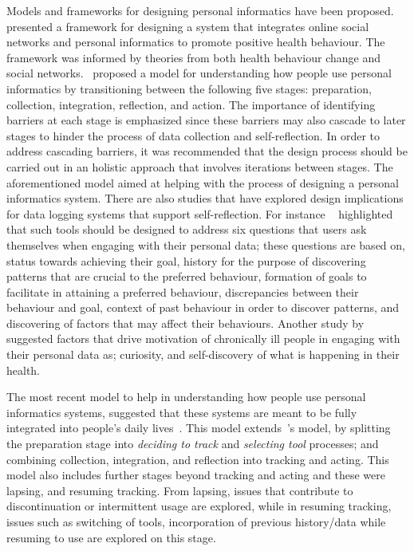 Models and frameworks for designing personal informatics have been proposed.~\cite{kamal2010understanding} presented a framework for designing a system that integrates online social networks and personal informatics to promote positive health behaviour. The framework was informed by theories from both health behaviour change and social networks.~\cite{li2010stage} proposed a model for understanding how people use personal informatics by transitioning between the following five stages: preparation, collection, integration, reflection, and action. The importance of identifying barriers at each stage is emphasized since these barriers may also cascade to later stages to hinder the process of data collection and self-reflection. In order to address cascading barriers, it was recommended that the design process should be carried out in an holistic approach that involves iterations between stages. The aforementioned model aimed at helping with the process of designing a personal informatics system. There are also studies that have explored design implications for data logging systems that support self-reflection. For instance ~\cite{li2011understanding} highlighted that such tools should be designed to address six questions that users ask themselves when engaging with their personal data; these questions are based on, status towards achieving their goal, history for the purpose of discovering patterns that are crucial to the preferred behaviour, formation of goals to facilitate in attaining a preferred behaviour, discrepancies between their behaviour and goal, context of past behaviour in order to discover patterns, and discovering of factors that may affect their behaviours. Another study by~\cite{macleod2013personal} suggested factors that drive motivation of chronically ill people in engaging with their personal data as; curiosity, and self-discovery of what is happening in their health.

The most recent model to help in understanding how people use personal informatics systems, suggested that these systems are meant to be fully integrated into people's daily lives~\citep{epstein2015lived}. This model extends~\cite{li2010stage}'s model, by splitting the preparation stage into \emph{deciding to track} and \emph{selecting tool} processes; and combining collection, integration, and reflection into tracking and acting. This model also includes further stages beyond tracking and acting and these were lapsing, and resuming tracking.  From lapsing, issues that contribute to discontinuation or intermittent usage are explored, while in resuming tracking, issues such as switching of tools, incorporation of previous history/data while resuming to use are explored on this stage.  

